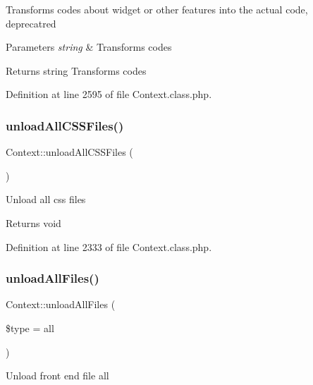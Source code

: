 Transforms codes about widget or other features into the actual code, deprecatred


\begin{DoxyParams}{Parameters}
{\em string} & Transforms codes \\
\hline
\end{DoxyParams}
\begin{DoxyReturn}{Returns}
string Transforms codes 
\end{DoxyReturn}


Definition at line 2595 of file Context.\+class.\+php.

\mbox{\label{classContext_a9eb05677aeb2e95029a10919ffc6053f}} 
\subsubsection{\texorpdfstring{unload\+All\+C\+S\+S\+Files()}{unloadAllCSSFiles()}}
{\footnotesize\ttfamily Context\+::unload\+All\+C\+S\+S\+Files (\begin{DoxyParamCaption}{ }\end{DoxyParamCaption})}

Unload all css files

\begin{DoxyReturn}{Returns}
void 
\end{DoxyReturn}


Definition at line 2333 of file Context.\+class.\+php.

\mbox{\label{classContext_a9b73c566c20a2ea32cab8180957c4b6d}} 
\subsubsection{\texorpdfstring{unload\+All\+Files()}{unloadAllFiles()}}
{\footnotesize\ttfamily Context\+::unload\+All\+Files (\begin{DoxyParamCaption}\item[{}]{\$type = {\ttfamily \textquotesingle{}all\textquotesingle{}} }\end{DoxyParamCaption})}

Unload front end file all


